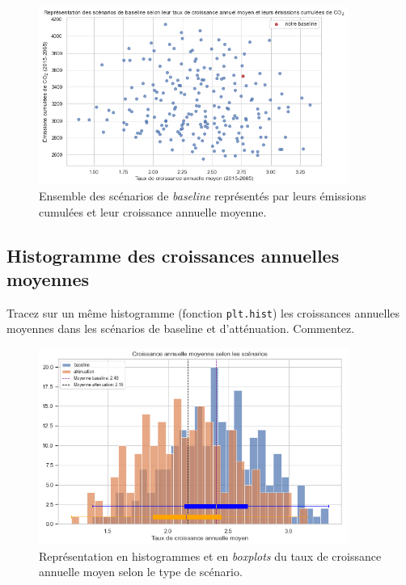 \documentclass[a4,11pt]{aleph-notas}
\newcommand{\ans}[1]{
\begin{mdframed}[
    roundcorner=10pt,     %
    backgroundcolor=gray!20, %
    linecolor=black,      %
    linewidth=1pt,        %
    innertopmargin=10pt,  %
    innerbottommargin=10pt, %
    innerleftmargin=10pt,  %
    innerrightmargin=10pt  %
]
#1
\end{mdframed}
}
\begin{document}
\begin{figure}[H]
    \centering
    \includegraphics[width=0.9\textwidth]{images_IMACLIM/baselines_scenarios.png}
    \caption{Ensemble des scénarios de \textit{baseline} représentés par leurs émissions cumulées et leur croissance annuelle moyenne.}
    \label{fig:baselines_scenarios}
\end{figure}


\subsection{Histogramme des croissances annuelles moyennes}
\ans{Tracez sur un même histogramme (fonction \texttt{plt.hist}) les croissances annuelles \\
moyennes dans les scénarios de baseline et d’atténuation. Commentez.}

\begin{figure}[H]
    \centering
    \includegraphics[width=0.9\textwidth]{images_IMACLIM/histo_growth.png}
    \caption{Représentation en histogrammes et en \textit{boxplots} du taux de croissance annuelle moyen selon le type de scénario.}
    \label{histo_growth}
\end{figure}
\end{document}
